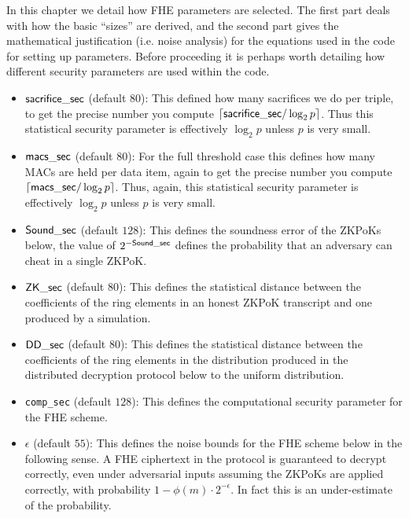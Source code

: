 \label{sec:fhe}
In this chapter we detail how FHE parameters are selected.
The first part deals with how the basic ``sizes'' are derived,
and the second part gives the mathematical justification (i.e.
noise analysis) for the equations used in the code for setting
up parameters.
Before proceeding it is perhaps worth detailing how
different security parameters are used within the code.

\begin{itemize}
  \item $\mathsf{sacrifice\_sec}$ (default $80$):
        This defined how many sacrifices we do per triple,
        to get the precise number you compute ${\lceil \mathsf{sacrifice\_sec}/\log_2 p \rceil}$.
        Thus this statistical security parameter is effectively
        $\log_2 p$ unless $p$ is very small.
  \item $\mathsf{macs\_sec}$ (default $80$):
        For the full threshold case this defines how many MACs are held
        per data item, again to get the precise number you compute
        ${\lceil \mathsf{macs\_sec}/\log_2 p \rceil}$.
        Thus, again, this statistical security parameter is effectively
        $\log_2 p$ unless $p$ is very small.
  \item $\mathsf{Sound\_sec}$ (default $128$):
        This defines the soundness error of the ZKPoKs below,
        the value of $2^{-\mathsf{Sound\_sec}}$ defines the probability
        that an adversary can cheat in a single ZKPoK.
  \item $\mathsf{ZK\_sec}$ (default $80$):
        This defines the statistical distance between the
        coefficients of the ring elements in an honest ZKPoK
        transcript and one produced by a simulation.
  \item $\mathsf{DD\_sec}$ (default $80$):
        This defines the statistical distance between the
        coefficients of the ring elements in the distribution produced
        in the distributed decryption protocol below to the uniform
        distribution.
  \item \verb+comp_sec+ (default $128$):
        This defines the computational security parameter for the
        FHE scheme.
  \item $\epsilon$ (default $55$):
        This defines the noise bounds for the FHE scheme below in
        the following sense.
        A FHE ciphertext in the protocol is guaranteed to decrypt
        correctly, even under adversarial inputs assuming the
        ZKPoKs are applied correctly, with probability $1-\phi(m) \cdot 2^{-\epsilon}$.
        In fact this is an under-estimate of the probability.

\end{itemize}
